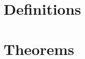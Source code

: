 \documentclass{fit-teorsem}
\begin{document}
\section*{Definitions}

\section*{Theorems}
\end{document}
